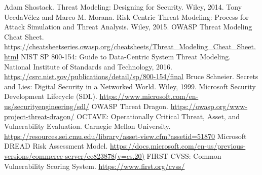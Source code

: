 
\begin{thebibliography}{99}
 Adam Shostack. Threat Modeling: Designing for Security. Wiley, 2014.
 Tony UcedaVélez and Marco M. Morana. Risk Centric Threat Modeling: Process for Attack Simulation and Threat Analysis. Wiley, 2015.
 OWASP Threat Modeling Cheat Sheet. \url{https://cheatsheetseries.owasp.org/cheatsheets/Threat_Modeling_Cheat_Sheet.html}
 NIST SP 800-154: Guide to Data-Centric System Threat Modeling. National Institute of Standards and Technology, 2016. \url{https://csrc.nist.gov/publications/detail/sp/800-154/final}
 Bruce Schneier. Secrets and Lies: Digital Security in a Networked World. Wiley, 1999.
 Microsoft Security Development Lifecycle (SDL). \url{https://www.microsoft.com/en-us/securityengineering/sdl/}
 OWASP Threat Dragon. \url{https://owasp.org/www-project-threat-dragon/}
 OCTAVE: Operationally Critical Threat, Asset, and Vulnerability Evaluation. Carnegie Mellon University. \url{https://resources.sei.cmu.edu/library/asset-view.cfm?assetid=51870}
 Microsoft DREAD Risk Assessment Model. \url{https://docs.microsoft.com/en-us/previous-versions/commerce-server/ee823878(v=cs.20)}
 FIRST CVSS: Common Vulnerability Scoring System. \url{https://www.first.org/cvss/}
\end{thebibliography}
